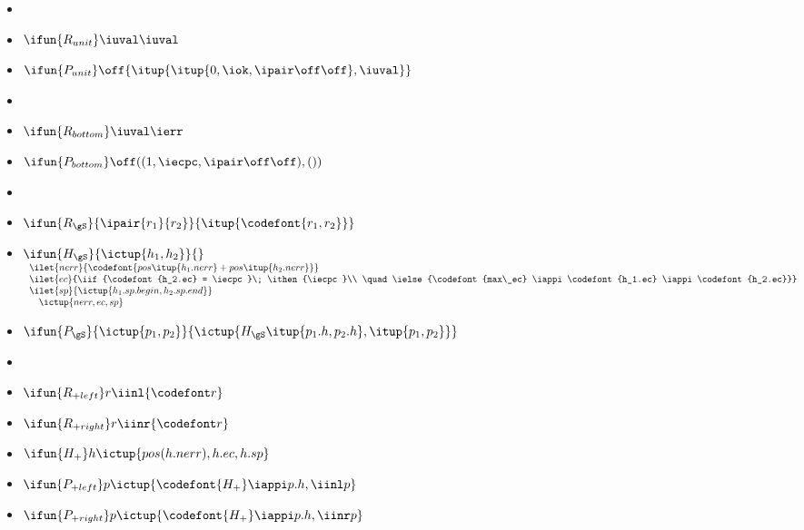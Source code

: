 \small
\begin{itemize}
\renewcommand{\labelitemi}{}

\item %
\item $\ifun {R_{unit}} \iuval \iuval$
\item $\ifun {P_{unit}} \off {\itup{\itup{0,\iok,\ipair \off \off},\iuval}}$

\item %
\item $\ifun {R_{bottom}} \iuval \ierr$
\item $\ifun {P_{bottom}} \off ((1,\iecpc,\ipair \off \off),())$

\item %
\item $\ifun {R_{\gS}} {\ipair {r_1} {r_2}} {\itup {\codefont{r_1,r_2}}}$
\item $\ifun{H_{\gS}} {\ictup{h_1,h_2}}{}$ \\
  $\begin{array}{l}
    \ilet {nerr} {\codefont{pos \itup{{h_1}.{nerr}} + pos \itup{{h_2}.{nerr}}}}\\
    \ilet {ec} {\iif {\codefont{h_2.ec} = \iecpc}\; \ithen {\iecpc}\\
    \quad \ielse {\codefont{max\_ec} \iappi \codefont{h_1.ec} \iappi \codefont{h_2.ec}}} \\
    \ilet {sp} {\ictup{h_1.sp.begin, h_2.sp.end}} \\
    \quad \ictup {nerr,ec,sp}
  \end{array}$

\item $\ifun {P_{\gS}} {\ictup{p_1, p_2}} {\ictup {H_{\gS} \itup{p_1.h,p_2.h},\itup{p_1,p_2}}}$

\item %
\item $\ifun {R_{+left}} r {\iinl {\codefont r}}$
\item $\ifun {R_{+right}} r {\iinr {\codefont r}}$

\item $\ifun {H_+} h {\ictup{pos(h.nerr),h.ec,h.sp}}$
\item $\ifun {P_{+left}} p {\ictup{\codefont{H_+} \iappi p.h, \iinl p}}$
\item $\ifun {P_{+right}} p {\ictup{\codefont{H_+} \iappi p.h, 
      \iinr  p}}$


\end{itemize}
